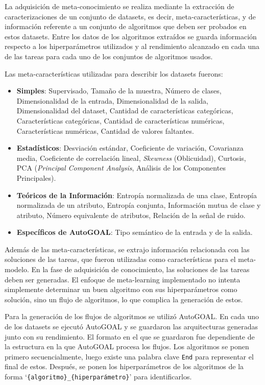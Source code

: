\documentclass[a4paper,12pt]{article}
\begin{document}
	La adquisición de meta-conocimiento se realiza mediante la extracción de caracterizaciones de un conjunto de datasets, es decir, meta-características, y de información referente a un conjunto de algoritmos que deben ser probados en estos datasets. Entre los datos de los algoritmos extraídos se guarda información respecto a los hiperparámetros utilizados y al rendimiento alcanzado en cada una de las tareas para cada uno de los conjuntos de algoritmos usados.

	Las meta-características utilizadas para describir los datasets fuerons:
	\begin{itemize}
		\item \textbf{Simples}: Supervisado, Tamaño de la muestra, Número de clases, Dimensionalidad de la entrada, Dimensionalidad de la salida, Dimensionalidad del dataset, Cantidad de características categóricas, Características categóricas, Cantidad de características numéricas, Características numéricas, Cantidad de valores faltantes.
		\item \textbf{Estadísticos}: Desviación estándar, Coeficiente de variación, Covarianza media, Coeficiente de correlación lineal, \textit{Skewness} (Oblicuidad), Curtosis, PCA (\textit{Principal Component Analysis}, Análisis de los Componentes Principales).
		\item \textbf{Teóricos de la Información}: Entropía normalizada de una clase, Entropía normalizada de un atributo, Entropía conjunta, Información mutua de clase y atributo, Número equivalente de atributos, Relación de la señal de ruido.
		\item \textbf{Específicos de AutoGOAL}: Tipo semántico de la entrada y de la salida.
	\end{itemize}

	Además de las meta-características, se extrajo información relacionada con las soluciones de las tareas, que fueron utilizadas como características para el meta-modelo. En la fase de adquisición de conocimiento, las soluciones de las tareas deben ser generadas. El enfoque de meta-learning implementado no intenta simplemente determinar un buen algoritmo con sus hiperparámetros como solución, sino un flujo de algoritmos, lo que complica la generación de estos. 
	
	Para la generación de los flujos de algoritmos se utilizó AutoGOAL. En cada uno de los datasets se ejecutó AutoGOAL y se guardaron las arquitecturas generadas junto con su rendimiento. El formato en el que se guardaron fue dependiente de la estructura en la que AutoGOAL procesa los flujos. Los algoritmos se ponen primero secuencialmente, luego existe una palabra clave \texttt{End} para representar el final de estos. Después, se ponen los hiperparámetros de los algoritmos de la forma  `\texttt{\{algoritmo\}\_\{hiperparámetro\}}' para identificarlos.
\end{document}

